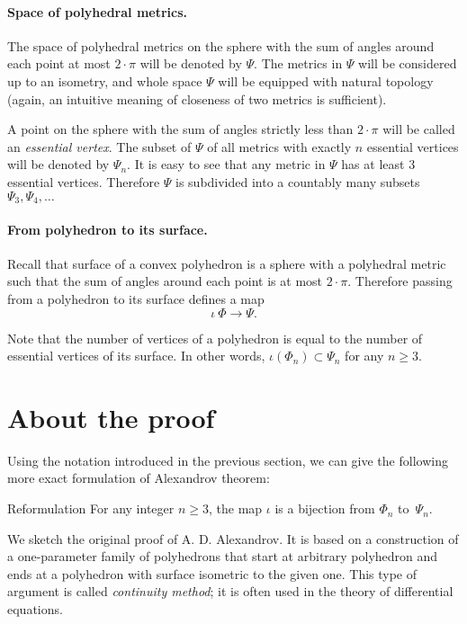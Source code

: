 \documentclass[oneside,a4paper]{article}
\begin{document}
\paragraph{Space of polyhedral metrics.}
The space of polyhedral metrics on the sphere with the sum of angles around each point at most $2\cdot\pi$ will be denoted by $\Psi$.
The metrics in $\Psi$ will be considered up to an isometry, and whole space $\Psi$ will be equipped with natural topology (again, an intuitive meaning of closeness of two metrics is sufficient).

A point on the sphere with the sum of angles strictly less than $2\cdot\pi$ will be called an \emph{essential vertex}.
The subset of $\Psi$ of all metrics with exactly $n$ essential vertices will be denoted by $\Psi_n$.
It is easy to see that any metric in $\Psi$ has at least 3 essential vertices.
Therefore $\Psi$ is subdivided into a countably many subsets $\Psi_3,\Psi_4,\dots$

\paragraph{From polyhedron to its surface.}
Recall that surface of a convex polyhedron is a sphere with a polyhedral metric such that the sum of angles around each point is at most $2\cdot\pi$.
Therefore passing from a polyhedron to its surface defines a map
\[\iota\:\Phi\to \Psi.\]

Note that the number of vertices of a polyhedron is equal to the number of essential vertices of its surface.
In other words, $\iota(\Phi_n)\subset \Psi_n$ for any $n\ge 3$.

\section{About the proof}

Using the notation introduced in the previous section, we can give the following more exact formulation of Alexandrov theorem: 

\begin{thm}{Reformulation}
For any integer $n\ge 3$,
the map $\iota$ is a bijection from $\Phi_n$ to~$\Psi_n$.
\end{thm}

We sketch the original proof of A. D. Alexandrov.
It is based on a construction of a one-parameter family of polyhedrons that start at arbitrary polyhedron
and ends at a polyhedron with surface isometric to the given one.
This type of argument is called \emph{continuity method}; it is often used in the theory of differential equations.
\end{document}
